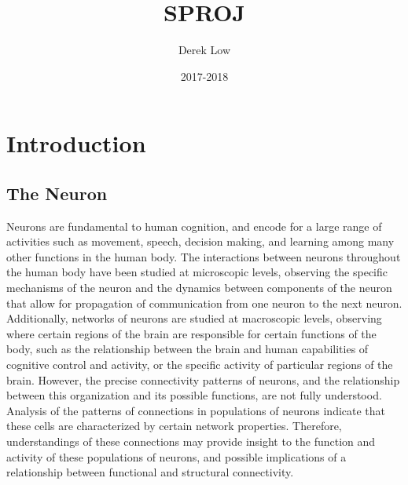 \documentclass[11pt]{article}
\title{SPROJ}
\author{Derek Low}
\date{2017-2018}
\begin{document}
\maketitle

\section{Introduction}

\subsection{The Neuron}
Neurons are fundamental to human cognition, and encode for a large range of activities such as movement, speech, decision making, and learning among many other functions in the human body. The interactions between neurons throughout the human body have been studied at microscopic levels, observing the specific mechanisms of the neuron and the dynamics between components of the neuron that allow for propagation of communication from one neuron to the next neuron. Additionally, networks of neurons are studied at macroscopic levels, observing where certain regions of the brain are responsible for certain functions of the body, such as the relationship between the brain and human capabilities of cognitive control and activity, or the specific activity of particular regions of the brain. However, the precise connectivity patterns of neurons, and the relationship between this organization and its possible functions, are not fully understood. Analysis of the patterns of connections in populations of neurons indicate that these cells are characterized by certain network properties. Therefore, understandings of these connections may provide insight to the function and activity of these populations of neurons, and possible implications of a relationship between functional and structural connectivity.\par
\end{document}

